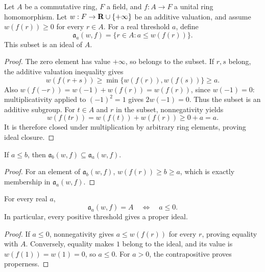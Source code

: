 \begin{definition}
\label{sc0-canonical-port:alg:valuation-ideal}
\leanok
Let \(A\) be a commutative ring, \(F\) a field, and
\(f:A\to F\) a unital ring homomorphism. Let
\(w:F\to\mathbf{R}\cup\{+\infty\}\) be an additive valuation, and
assume \(w(f(r))\geq0\) for every \(r\in A\). For a real
threshold \(a\), define
\[
 \mathfrak a_a(w,f)=\{r\in A:a\leq w(f(r))\}.
\]
This subset is an ideal of \(A\).
\end{definition}
\begin{proof}
The zero element has value \(+\infty\), so belongs to the subset.
If \(r,s\) belong, the additive valuation inequality gives
\[
 w(f(r+s))\geq\min\{w(f(r)),w(f(s))\}\geq a.
\]
Also \(w(f(-r))=w(-1)+w(f(r))=w(f(r))\), since
\(w(-1)=0\): multiplicativity applied to \((-1)^2=1\) gives
\(2w(-1)=0\). Thus the subset is an additive subgroup.
For \(t\in A\) and \(r\) in the subset, nonnegativity yields
\[
 w(f(tr))=w(f(t))+w(f(r))\geq0+a=a.
\]
It is therefore closed under multiplication by arbitrary ring
elements, proving ideal closure.
\end{proof}

\begin{lemma}
\label{sc0-canonical-port:alg:valuation-ideal-antitone}
\leanok
If \(a\leq b\), then
\(\mathfrak a_b(w,f)\subseteq\mathfrak a_a(w,f)\).
\end{lemma}
\begin{proof}
For an element of \(\mathfrak a_b(w,f)\),
\(w(f(r))\geq b\geq a\), which is exactly membership in
\(\mathfrak a_a(w,f)\).
\end{proof}

\begin{lemma}
\label{sc0-canonical-port:alg:valuation-ideal-top}
\leanok
For every real \(a\),
\[
 \mathfrak a_a(w,f)=A\quad\Longleftrightarrow\quad a\leq0.
\]
In particular, every positive threshold gives a proper ideal.
\end{lemma}
\begin{proof}
If \(a\leq0\), nonnegativity gives \(a\leq w(f(r))\) for every
\(r\), proving equality with \(A\). Conversely, equality makes
\(1\) belong to the ideal, and its value is
\(w(f(1))=w(1)=0\), so \(a\leq0\). For \(a>0\), the
contrapositive proves properness.
\end{proof}

